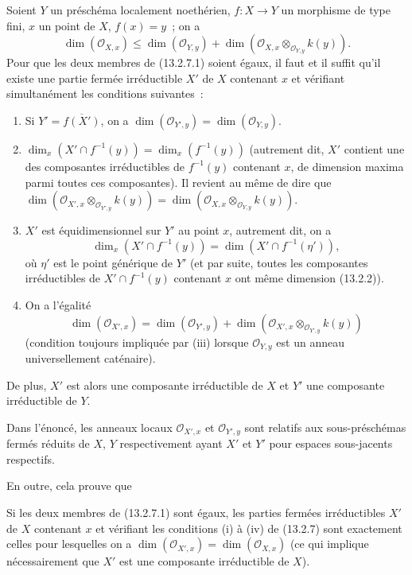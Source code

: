 \begin{proposition}[13.2.7]
\label{IV.13.2.7-fr}
Soient $Y$ un préschéma localement noethérien, $f:X\to Y$ un morphisme de type
fini, $x$ un point de $X$, $f(x)=y$~; on a
\[
\tag{13.2.7.1}
\label{IV.13.2.7.1-fr}
  \dim(\mathcal O_{X,x})\leq\dim(\mathcal O_{Y,y})
  +\dim(\mathcal O_{X,x}\otimes_{\mathcal O_{Y,y}}k(y)).
\]
Pour que les deux membres de (13.2.7.1) soient égaux, il faut et il suffit
qu'il existe une partie fermée irréductible $X'$ de $X$ contenant $x$ et
vérifiant simultanément les conditions suivantes~:
\begin{enumerate}[label=(\roman*)]
  \item Si $Y'=\overline{f(X')}$, on a
  $\dim(\mathcal O_{Y',y})=\dim(\mathcal O_{Y,y})$.
  \item $\dim_x(X'\cap f^{-1}(y))=\dim_x(f^{-1}(y))$ (autrement dit, $X'$
  contient une des composantes irréductibles de $f^{-1}(y)$ contenant $x$, de
  dimension maxima parmi toutes ces composantes). Il revient au même de dire
  que
  $\dim(\mathcal O_{X',x}\otimes_{\mathcal O_{Y',y}}k(y))
  =\dim(\mathcal O_{X,x}\otimes_{\mathcal O_{Y,y}}k(y))$.
  \item $X'$ est équidimensionnel sur $Y'$ au point $x$, autrement dit, on a
  \[
    \dim_x(X'\cap f^{-1}(y))=\dim(X'\cap f^{-1}(\eta')),
  \]
  où $\eta'$ est le point générique de $Y'$ (et par suite, toutes les
  composantes irréductibles de $X'\cap f^{-1}(y)$ contenant $x$ ont même
  dimension (13.2.2)).

  \item On a l'égalité
  \[
    \dim(\mathcal O_{X',x})=\dim(\mathcal O_{Y',y})
    +\dim(\mathcal O_{X',x}\otimes_{\mathcal O_{Y',y}}k(y))
  \]
  (condition toujours impliquée par (iii) lorsque $\mathcal O_{Y,y}$ est un
  anneau universellement caténaire).
\end{enumerate}
De plus, $X'$ est alors une composante irréductible de $X$ et $Y'$ une
composante irréductible de $Y$.
\end{proposition}

Dans l'énoncé, les anneaux locaux $\mathcal O_{X',x}$ et
$\mathcal O_{Y',y}$ sont relatifs aux sous-préschémas fermés réduits de $X$,
$Y$ respectivement ayant $X'$ et $Y'$ pour espaces sous-jacents respectifs.

En outre, cela prouve que

\begin{corollary}[13.2.8]
\label{IV.13.2.8-fr}
Si les deux membres de (13.2.7.1) sont égaux, les parties fermées irréductibles
$X'$ de $X$ contenant $x$ et vérifiant les conditions (i) à (iv) de (13.2.7)
sont exactement celles pour lesquelles on a
$\dim(\mathcal O_{X',x})=\dim(\mathcal O_{X,x})$ (ce qui implique
nécessairement que $X'$ est une composante irréductible de $X$).
\end{corollary}

